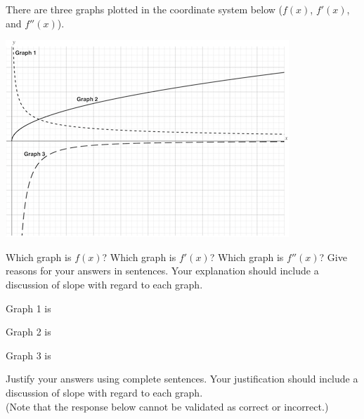 \documentclass[handout]{ximera}
\begin{document}
\begin{problem}
There are three graphs plotted in the coordinate system below ($f(x)$, $f'(x)$, and $f''(x)$). 

\includegraphics[scale=.01]{SVA-labelscaled.png}


Which graph is $f(x)$? Which graph is $f'(x)$? Which graph is $f''(x)$? Give reasons for your answers in sentences. Your explanation should include a discussion of slope with regard to each graph.

\begin{question}
Graph 1 is
\begin{multipleChoice}
\end{multipleChoice}
\end{question}

\begin{question}
Graph 2 is
\begin{multipleChoice}
\end{multipleChoice}
\end{question}

\begin{question}
Graph 3 is
\begin{multipleChoice}
\end{multipleChoice}
\end{question}


Justify your answers using complete sentences. Your justification should include a discussion of slope with regard to each graph. \\  (Note that the response below cannot be validated as correct or incorrect.)
\begin{freeResponse}
\end{freeResponse}
\end{problem}
\end{document}

